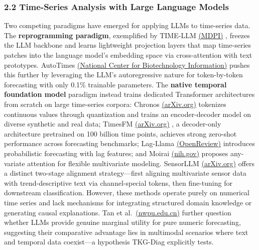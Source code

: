 \documentclass[
  11pt,
]{article}
\begin{document}
\subsubsection{2.2 Time-Series Analysis with Large Language
Models}\label{time-series-analysis-with-large-language-models}

Two competing paradigms have emerged for applying LLMs to time-series
data. The \textbf{reprogramming paradigm}, exemplified by TIME-LLM
\href{https://www.mdpi.com/1424-8220/25/19/6163}{(MDPI)} , freezes the
LLM backbone and learns lightweight projection layers that map
time-series patches into the language model's embedding space via
cross-attention with text prototypes. AutoTimes
\href{https://www.ncbi.nlm.nih.gov/pmc/articles/PMC9689069/}{(National
Center for Biotechnology Information)} pushes this further by leveraging
the LLM's autoregressive nature for token-by-token forecasting with only
0.1\% trainable parameters. The \textbf{native temporal foundation
model} paradigm instead trains dedicated Transformer architectures from
scratch on large time-series corpora: Chronos
\href{https://arxiv.org/abs/2512.16760}{(arXiv.org)} tokenizes
continuous values through quantization and trains an encoder-decoder
model on diverse synthetic and real data; TimesFM
\href{https://arxiv.org/html/2503.11265v1}{(arXiv.org)} , a decoder-only
architecture pretrained on 100 billion time points, achieves strong
zero-shot performance across forecasting benchmarks; Lag-Llama
\href{https://openreview.net/pdf?id=eJYJ5mNohO}{(OpenReview)} introduces
probabilistic forecasting with lag features; and Moirai
\href{https://pmc.ncbi.nlm.nih.gov/articles/PMC11828369/}{(nih.gov)}
proposes any-variate attention for flexible multivariate modeling.
SensorLLM \href{https://arxiv.org/html/2505.19381v1}{(arXiv.org)} offers
a distinct two-stage alignment strategy---first aligning multivariate
sensor data with trend-descriptive text via channel-special tokens, then
fine-tuning for downstream classification. However, these methods
operate purely on numerical time series and lack mechanisms for
integrating structured domain knowledge or generating causal
explanations. Tan et
al.~\href{https://pure.nwpu.edu.cn/en/publications/advancing-uav-sensor-fault-diagnosis-based-on-prior-knowledge-and-2/}{(nwpu.edu.cn)}
further question whether LLMs provide genuine marginal utility for pure
numeric forecasting, suggesting their comparative advantage lies in
multimodal scenarios where text and temporal data coexist---a hypothesis
TKG-Diag explicitly tests.
\end{document}
